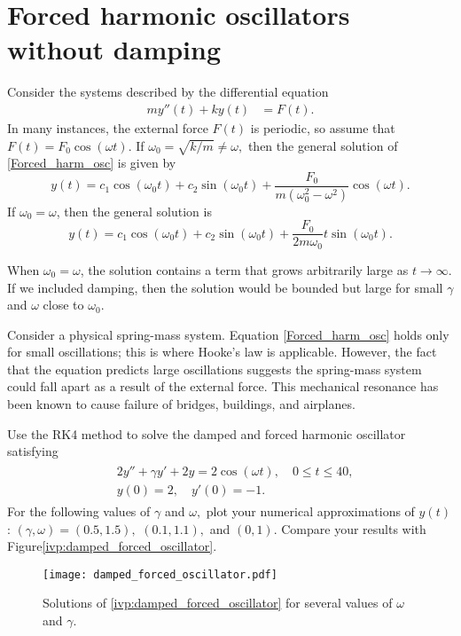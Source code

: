 \section*{Forced harmonic oscillators without damping}
Consider the systems described by the differential equation
\begin{align}
my''(t)  + ky(t) &= F(t). \label{Forced_harm_osc}
\end{align}
In many instances, the external force $F(t)$ is periodic, so assume that $F(t) = F_0 \cos(\omega t)$. 
If $\omega_0 = \sqrt{k/m} \not = \omega,$ then the  general solution of \ref{Forced_harm_osc} is given by
\[y(t) = c_1 \cos (\omega_0 t) + c_2\sin (\omega_0 t) + \frac{F_0}{m(\omega_0^2 - \omega^2)} \cos (\omega t).\]
If $\omega_0 = \omega$, then the general solution is
\[y(t) = c_1 \cos (\omega_0 t) + c_2\sin (\omega_0 t) + \frac{F_0}{2m\omega_0} t \sin (\omega_0 t).\]

When $\omega_0 = \omega$, the solution contains a term that grows arbitrarily large as $t \to \infty$.
If we included damping, then the solution would be bounded but large for small $\gamma$ and $\omega$ close to $\omega_0$.

Consider a physical spring-mass system.
Equation \ref{Forced_harm_osc} holds only for small oscillations; this is where Hooke's law is applicable.
However, the fact that the equation predicts large oscillations suggests the spring-mass system could fall apart as a result of the external force. 
This mechanical resonance has been known to cause failure of bridges, buildings, and airplanes.

\begin{problem}
Use the RK4 method to solve the damped and forced harmonic oscillator satisfying 
\begin{align}
	\begin{split}
&{}2y'' + \gamma y' + 2y = 2 \cos (\omega t), \quad 0 \leq t \leq 40,\\
&{}y(0) = 2, \quad
y'(0) = -1. 
	\end{split}
	\label{ivp:damped_forced_oscillator}
\end{align}
For the following values of $\gamma$ and $\omega,$ plot your numerical approximations of $y(t)$: $(\gamma, \omega) = (0.5, 1.5),$ $(0.1, 1.1),$ and $(0, 1)$.
Compare your results with Figure\ref{ivp:damped_forced_oscillator}.
\end{problem}


\begin{figure}[H]
\centering
\texttt{[image: damped\_forced\_oscillator.pdf]}
\caption{Solutions of \eqref{ivp:damped_forced_oscillator} for several values of $\omega$ and $\gamma$.}
\label{ivp:damped_forced_oscillator_figure}
\end{figure}
